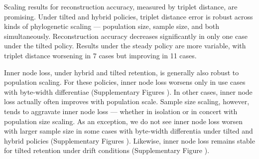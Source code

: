 Scaling results for reconstruction accuracy, measured by triplet distance, are promising.
Under tilted and hybrid policies, triplet distance error is robust across kinds of phylogenetic scaling --- population size, sample size, and both simultaneously.
Reconstruction accuracy decreases significantly in only one case under the tilted policy.
Results under the steady policy are more variable, with triplet distance worsening in 7 cases but improving in 11 cases.

Inner node loss, under hybrid and tilted retention, is generally also robust to population scaling.
For these policies, inner node loss worsens only in use cases with byte-width differentiae (Supplementary Figures ).
In other cases, inner node loss actually often improves with population scale.
Sample size scaling, however, tends to aggravate inner node loss --- whether in isolation or in concert with population size scaling.
As an exception, we do not see inner node loss worsen with larger sample size in some cases with byte-width differentia under tilted and hybrid policies (Supplementary Figures ).
Likewise, inner node loss remains stable for tilted retention under drift conditions (Supplementary Figure ).
